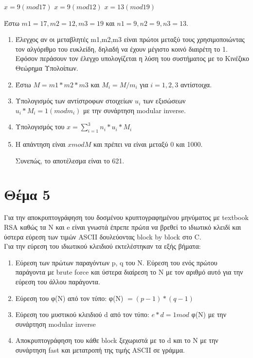 \documentclass[a4paper, 11pt]{article}
\newcommand{\lt}{\latintext}
\begin{document}
$ x = 9 (mod 17)$
$ x = 9 (mod 12)$
$ x = 13 (mod 19)$

Έστω $ m1 = 17, m2 = 12, m3 = 19$ και $ n1 = 9, n2 = 9, n3 = 13 $.

\begin{enumerate}

\item Έλεγχος αν οι μεταβλητές {\lt m1,m2,m3} είναι πρώτοι μεταξύ τους χρησιμοποιώντας τον αλγόριθμο του ευκλείδη, δηλαδή να έχουν μέγιστο κοινό διαιρέτη το 1. Εφόσον περάσουν τον έλεγχο υπολογίζεται η λύση του συστήματος με το Κινέζικο Θεώρημα Υπολοίπων.

\item Έστω $ M = m1 * m2 * m3 $ και $ M_i = M / m_i $ για $ i = 1,2,3 $ αντίστοιχα.

\item Υπολογισμός των αντίστροφων στοιχείων $ u_i $ των εξισώσεων $ u_i * M_i = 1 (mod m_i) $ με την συνάρτηση {\lt modular inverse}.

\item Υπολογισμός του $ x = \sum_{i=1}^{3} n_i * u_i * M_i $

\item Η απάντηση είναι $ x mod M $ και πρέπει να είναι μεταξύ 0 και 1000.

Συνεπώς, το αποτέλεσμα είναι το 621.

\end{enumerate}

\section*{Θέμα 5}


Για την αποκρυπτογράφηση του δοσμένου κρυπτογραφημένου μηνύματος με {\lt textbook RSA} καθώς τα {\lt N} και {\lt e} είναι γνωστά έπρεπε πρώτα να βρεθεί το ιδιωτικό κλειδί και ύστερα εύρεση των τιμών {\lt ASCII} δουλεύοντας {\lt block by block} στο {\lt C}. \\

Για την εύρεση του ιδιωτικού κλειδιού εκτελέστηκαν τα εξής βήματα:

\begin{enumerate}

\item Εύρεση των πρώτων παραγόντων {\lt p, q} του {\lt N}. Εύρεση του ενός πρώτου παράγοντα με {\lt brute force} και ύστερα διαίρεση το {\lt N} με τον αριθμό αυτό για την εύρεση του άλλου παράγοντα.

\item Εύρεση του φ(Ν) από τον τύπο: φ(Ν) $ = (p - 1) * (q - 1) $

\item Εύρεση του μυστικού κλειδιού {\lt d} από τον τύπο: $ e * d = 1 mod $ φ(Ν) με την συνάρτηση {\lt modular inverse}

\item Αποκρυπτογράφηση του κάθε {\lt block} ξεχωριστά με το {\lt d } και το {\lt N}  με την συνάρτηση {\lt fast} και μετατροπή της τιμής {\lt ASCII} σε γράμμα.

\end{enumerate}
\end{document}
